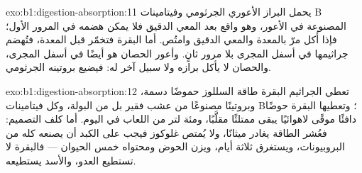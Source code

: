 \begin{solution}{exo:b1:digestion-absorption:11}
يحمل البراز الأعوري  الجرثومي وفيتامينات B المصنوعة في
الأعور، وهو واقع بعد المعي الدقيق فلا يمكن هضمه في المرور الأول؛
فإذا أُكل مرّ بالمعدة والمعي الدقيق وامتُص. أما البقرة فتخمّر قبل
المعدة، فتُهضم جراثيمها في أسفل المجرى بلا مرور ثانٍ. وأعور
الحصان هو أيضًا في أسفل المجرى، والحصان لا يأكل برازه ولا سبيل
آخر له: فيضيع بروتينه الجرثومي.
\end{solution}

\begin{solution}{exo:b1:digestion-absorption:12}
تعطي الجراثيم البقرة طاقة السللوز حموضًا دسمة، وبروتينًا مصنوعًا
من عشب فقير بل من البولة، وكل فيتامينات B؛ وتعطيها البقرة حوضًا
دافئًا موقًى لاهوائيًا يبقى ممتلئًا مقلَّبًا، ومئة لتر من اللعاب
في اليوم. أما كلف التصميم: فعُشر الطاقة يغادر ميثانًا، ولا يُمتص
غلوكوز فيجب على الكبد أن يصنعه كله من البروبيونات، ويستغرق 
ثلاثة أيام، ويزن الحوض ومحتواه خمس الحيوان --- فالبقرة لا تستطيع
العدو، والأسد يستطيعه.
\end{solution}


